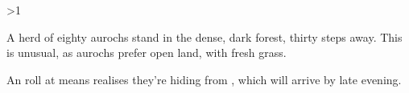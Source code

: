 \auroch

\ifnum\value{temperature}>1
\else
\fi

A herd of eighty aurochs stand in the dense, dark forest, thirty \glspl{step} away.
This is unusual, as aurochs prefer open land, with fresh grass.

An  roll at \tn[10] means  realises they're hiding from , which will arrive by late evening.

